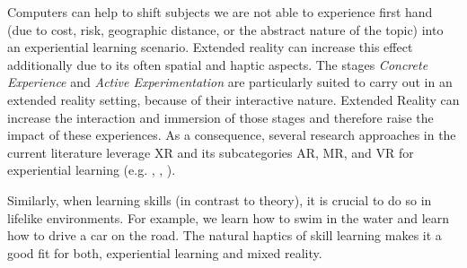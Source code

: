 Computers can help to shift subjects we are not able to experience first hand (due to cost, risk, geographic distance, or the abstract nature of the topic) into an experiential learning scenario. Extended reality can increase this effect additionally due to its often spatial and haptic aspects.
The stages \emph{Concrete Experience} and \emph{Active Experimentation} are particularly suited to carry out in an extended reality setting, because of their interactive nature. Extended Reality can increase the interaction and immersion of those stages and therefore raise the impact of these experiences.
As a consequence, several research approaches in the current literature leverage XR and its subcategories AR, MR, and VR for experiential learning (e.g. \cite{asad2021virtual}, \cite{majgaard2020virtual}, \cite{wang2007experiential}).

Similarly, when learning skills (in contrast to theory), it is crucial to do so in lifelike environments. For example, we learn how to swim in the water and learn how to drive a car on the road. The natural haptics of skill learning makes it a good fit for both, experiential learning and mixed reality.